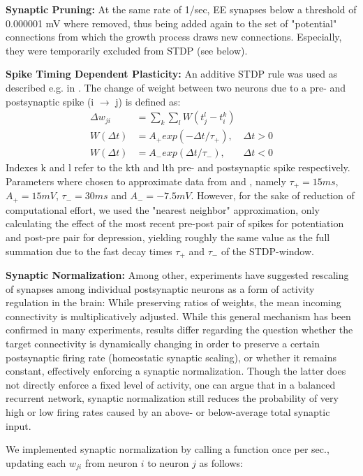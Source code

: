 \documentclass[10pt,a4paper]{article}
\begin{document}
\textbf{Synaptic Pruning:} At the same rate of 1/sec, EE synapses below a threshold of 0.000001 mV where removed, thus being added again to the set of "potential" connections from which the growth process draws new connections. Especially, they were temporarily excluded from STDP (see below).

\textbf{Spike Timing Dependent Plasticity:} An additive STDP rule was used as described e.g. in \cite{Zhang_STDP}. The change of weight between two neurons due to a pre- and postsynaptic spike (i $\rightarrow$ j) is defined as:
\begin{align}
\Delta w_{ji} &= \sum_k \sum_l W(t_j^l - t_i^k) \label{STDP_rule} \\
W(\Delta t) &= A_{+} exp(-\Delta t / \tau_{+}), & \Delta t > 0 \label{STDP_pos} \\
W(\Delta t) &= A_{-} exp(\Delta t / \tau_{-}), & \Delta t < 0 \label{STDP_neg}
\end{align}
Indexes k and l refer to the kth and lth pre- and postsynaptic spike respectively. Parameters where chosen to approximate data from \cite{Bi_Poo_STDP} and \cite{Froemke_STDP}, namely $\tau_{+} = 15 ms$, $A_{+} = 15 mV$, $\tau_{-} = 30 ms$ and $A_{-} = -7.5 mV$. However, for the sake of reduction of computational effort, we used the "nearest neighbor" approximation, only calculating the effect of the most recent pre-post pair of spikes for potentiation and post-pre pair for depression, yielding roughly the same value as the full summation due to the fast decay times $\tau_{+}$ and $\tau_{-}$ of the STDP-window.

\textbf{Synaptic Normalization:} Among other, experiments have suggested rescaling of synapses among individual postsynaptic neurons as a form of activity regulation in the brain: While preserving ratios of weights, the mean incoming connectivity is multiplicatively adjusted. While this general mechanism has been confirmed in many experiments, results differ regarding the question whether the target connectivity is dynamically changing in order to preserve a certain postsynaptic firing rate (homeostatic synaptic scaling), or whether it remains constant, effectively enforcing a synaptic normalization. Though the latter does not directly enforce a fixed level of activity, one can argue that in a balanced recurrent network, synaptic normalization still reduces the probability of very high or low firing rates caused by an above- or below-average total synaptic input.

We implemented synaptic normalization by calling a function once per sec., updating each $w_{ji}$ from neuron $i$ to neuron $j$ as follows:
\end{document}
